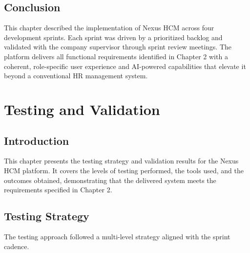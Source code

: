 \documentclass[12pt,a4paper]{report}
\begin{document}
\section{Conclusion}

This chapter described the implementation of Nexus HCM across four development sprints.
Each sprint was driven by a prioritized backlog and validated with the company supervisor
through sprint review meetings. The platform delivers all functional requirements identified
in Chapter 2 with a coherent, role-specific user experience and AI-powered capabilities
that elevate it beyond a conventional HR management system.

\newpage

\chapter{Testing and Validation}

\section{Introduction}

This chapter presents the testing strategy and validation results for the Nexus HCM
platform. It covers the levels of testing performed, the tools used, and the outcomes
obtained, demonstrating that the delivered system meets the requirements specified
in Chapter 2.

\section{Testing Strategy}

The testing approach followed a multi-level strategy aligned with the sprint cadence.
\end{document}
